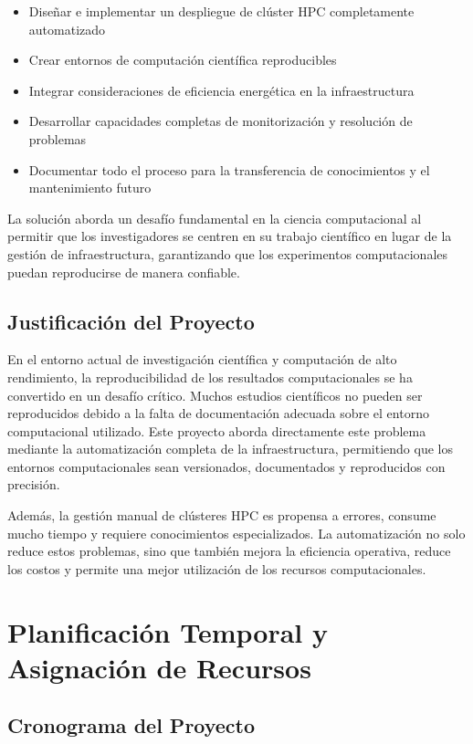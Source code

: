 \documentclass[12pt,a4paper]{report}
\begin{document}
\begin{itemize}
    \item Diseñar e implementar un despliegue de clúster HPC completamente automatizado
    \item Crear entornos de computación científica reproducibles
    \item Integrar consideraciones de eficiencia energética en la infraestructura
    \item Desarrollar capacidades completas de monitorización y resolución de problemas
    \item Documentar todo el proceso para la transferencia de conocimientos y el mantenimiento futuro
\end{itemize}

La solución aborda un desafío fundamental en la ciencia computacional al permitir que los investigadores se centren en su trabajo científico en lugar de la gestión de infraestructura, garantizando que los experimentos computacionales puedan reproducirse de manera confiable.

\section{Justificación del Proyecto}

En el entorno actual de investigación científica y computación de alto rendimiento, la reproducibilidad de los resultados computacionales se ha convertido en un desafío crítico. Muchos estudios científicos no pueden ser reproducidos debido a la falta de documentación adecuada sobre el entorno computacional utilizado. Este proyecto aborda directamente este problema mediante la automatización completa de la infraestructura, permitiendo que los entornos computacionales sean versionados, documentados y reproducidos con precisión.

Además, la gestión manual de clústeres HPC es propensa a errores, consume mucho tiempo y requiere conocimientos especializados. La automatización no solo reduce estos problemas, sino que también mejora la eficiencia operativa, reduce los costos y permite una mejor utilización de los recursos computacionales.

\chapter{Planificación Temporal y Asignación de Recursos}

\section{Cronograma del Proyecto}
\end{document}
